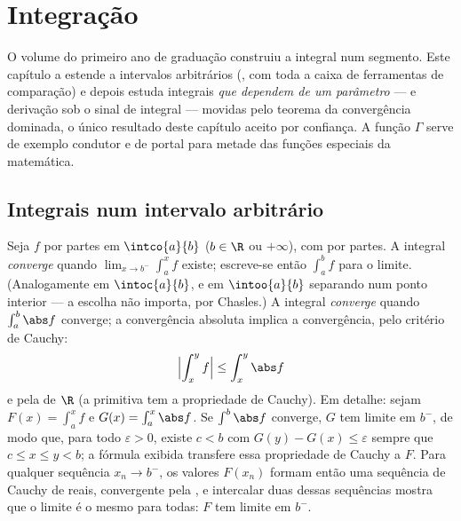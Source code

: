 \chapter{Integração}\label{ch:b2:integration}

O volume do primeiro ano de graduação construiu a integral num segmento. Este capítulo
a estende a intervalos arbitrários (, com toda a
caixa de ferramentas de comparação) e depois estuda integrais \emph{que dependem de um
parâmetro} ---  e derivação sob o sinal de
integral --- movidas pelo teorema da convergência dominada, o único
resultado deste capítulo aceito por confiança. A função $\Gamma$ serve
de exemplo condutor e de portal para metade das funções especiais
da matemática.

\section{Integrais num intervalo arbitrário}

\begin{definition}\label{def:b2:integration:improper}
Seja $f$  por partes em $\intco{a}{b}$ ($b \in \R$ ou
$+\infty$), com  por partes. A integral \emph{converge}
quando $\lim_{x \to b^-} \int_a^x f$ existe; escreve-se então
$\int_a^b f$ para o limite. (Analogamente em $\intoc{a}{b}$, e em
$\intoo{a}{b}$ separando num ponto interior --- a escolha não
importa, por Chasles.) A integral \emph{converge }
quando $\int_a^b \abs f$ converge; a convergência absoluta implica a
convergência, pelo critério de Cauchy:
\[
\Bigl| \int_x^{y} f \Bigr| \leq \int_x^{y} \abs f
\]
e pela  de $\R$ (a primitiva tem a propriedade de Cauchy).
Em detalhe: sejam $F(x) = \int_a^x f$ e $G(x) = \int_a^x \abs
f$. Se $\int^b\abs f$ converge, $G$ tem limite em $b^-$, de modo que,
para todo $\varepsilon > 0$, existe $c < b$ com $G(y) - G(x)
\leq \varepsilon$ sempre que $c \leq x \leq y < b$; a fórmula
exibida transfere essa propriedade de Cauchy a $F$. Para qualquer sequência $x_n
\to b^-$, os valores $F(x_n)$ formam então uma sequência de Cauchy de
reais, convergente pela , e intercalar duas dessas
sequências mostra que o limite é o mesmo para todas: $F$ tem
limite em $b^-$.
\end{definition}


